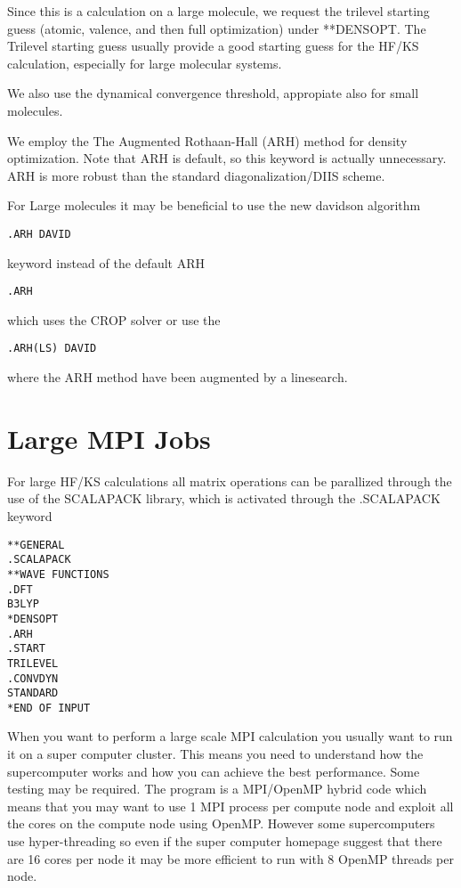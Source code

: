 Since this is a calculation on a large molecule, we request the trilevel starting 
guess\cite{trilevel1, trilevel2} (atomic, valence, and then full optimization) under **DENSOPT. 
The Trilevel starting guess usually provide a good starting guess 
for the HF/KS calculation, especially for large molecular systems. 
 
We also use the dynamical convergence threshold, appropiate also for small molecules. 

We employ the The Augmented Rothaan-Hall (ARH) method for density optimization. 
Note that ARH is default, so this keyword is actually unnecessary.
ARH is more robust than the standard diagonalization/DIIS scheme.

For Large molecules it may be beneficial to use the new davidson algorithm 

\begin{verbatim}
.ARH DAVID
\end{verbatim}

keyword instead of the default ARH

\begin{verbatim}
.ARH
\end{verbatim}
which uses the CROP solver or use the 
\begin{verbatim}
.ARH(LS) DAVID
\end{verbatim}
where the ARH method have been augmented by a linesearch. 

\section{Large MPI Jobs}

For large HF/KS calculations all matrix operations can be parallized through the use of the SCALAPACK library, which is activated through the .SCALAPACK keyword 

\begin{verbatim}
**GENERAL
.SCALAPACK
**WAVE FUNCTIONS
.DFT
B3LYP
*DENSOPT
.ARH
.START
TRILEVEL
.CONVDYN
STANDARD
*END OF INPUT
\end{verbatim}


When you want to perform a large scale MPI calculation you usually want to run it on a super computer cluster. This means you need to understand how the supercomputer works and how you can achieve the best performance. Some testing may be required. The {\lsdalton} program is a MPI/OpenMP hybrid code which means that you may want to use 1 MPI process per compute node and exploit all the cores on the compute node using OpenMP. However some supercomputers use hyper-threading so even if the super computer homepage suggest that there are 16 cores per node  it may be more efficient to run with 8 OpenMP threads per node.    

